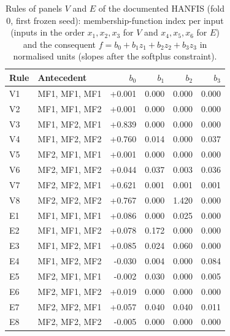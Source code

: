 \documentclass[pdflatex,sn-basic]{sn-jnl}
\theoremstyle{thmstyleone}%
\theoremstyle{thmstyletwo}%
\theoremstyle{thmstylethree}%
\begin{document}
\begin{table}[ht]
\caption{Rules of panels $V$ and $E$ of the documented HANFIS (fold 0, first frozen seed): membership-function index per input (inputs in the order $x_1,x_2,x_3$ for $V$ and $x_4,x_5,x_6$ for $E$) and the consequent $f=b_0+b_1z_1+b_2z_2+b_3z_3$ in normalised units (slopes after the softplus constraint).}
\footnotesize
\begin{tabular}{@{}llrrrr@{}}
\hline
Rule & Antecedent & $b_0$ & $b_1$ & $b_2$ & $b_3$\\
\hline
V1 & MF1, MF1, MF1 & +0.001 & 0.000 & 0.000 & 0.000\\
V2 & MF1, MF1, MF2 & +0.001 & 0.000 & 0.000 & 0.000\\
V3 & MF1, MF2, MF1 & +0.839 & 0.000 & 0.000 & 0.000\\
V4 & MF1, MF2, MF2 & +0.760 & 0.014 & 0.000 & 0.037\\
V5 & MF2, MF1, MF1 & +0.001 & 0.000 & 0.000 & 0.000\\
V6 & MF2, MF1, MF2 & +0.044 & 0.037 & 0.003 & 0.036\\
V7 & MF2, MF2, MF1 & +0.621 & 0.001 & 0.001 & 0.001\\
V8 & MF2, MF2, MF2 & +0.767 & 0.000 & 1.420 & 0.000\\
\hline
E1 & MF1, MF1, MF1 & +0.086 & 0.000 & 0.025 & 0.000\\
E2 & MF1, MF1, MF2 & +0.078 & 0.172 & 0.000 & 0.000\\
E3 & MF1, MF2, MF1 & +0.085 & 0.024 & 0.060 & 0.000\\
E4 & MF1, MF2, MF2 & -0.030 & 0.004 & 0.000 & 0.084\\
E5 & MF2, MF1, MF1 & -0.002 & 0.030 & 0.000 & 0.005\\
E6 & MF2, MF1, MF2 & +0.019 & 0.000 & 0.000 & 0.000\\
E7 & MF2, MF2, MF1 & +0.057 & 0.040 & 0.040 & 0.011\\
E8 & MF2, MF2, MF2 & -0.005 & 0.000 & 0.000 & 0.000\\
\hline
\end{tabular}
\end{table}
\end{document}
